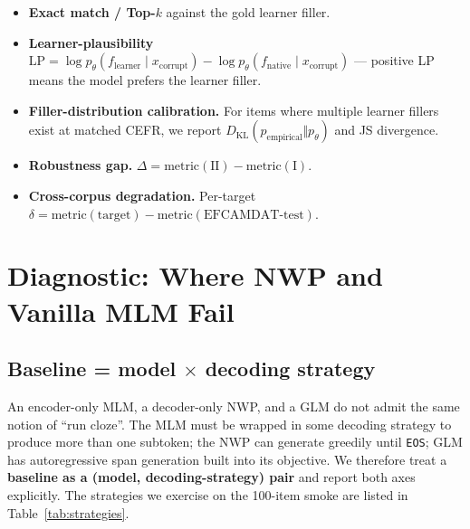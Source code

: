 \documentclass[11pt]{article}
\begin{document}
\begin{itemize}[leftmargin=*,itemsep=0.2em]
    \item \textbf{Exact match / Top-$k$} against the gold learner filler.
    \item \textbf{Learner-plausibility}
    $\mathrm{LP} = \log p_\theta(f_\text{learner}\mid x_\text{corrupt}) - \log p_\theta(f_\text{native}\mid x_\text{corrupt})$
    --- positive LP means the model prefers the learner filler.
    \item \textbf{Filler-distribution calibration.} For items where
    multiple learner fillers exist at matched CEFR, we report
    $D_{\mathrm{KL}}(p_\text{empirical}\Vert p_\theta)$ and JS divergence.
    \item \textbf{Robustness gap.} $\Delta = \text{metric}(\text{II}) - \text{metric}(\text{I})$.
    \item \textbf{Cross-corpus degradation.} Per-target $\delta =
    \text{metric}(\text{target}) - \text{metric}(\text{EFCAMDAT-test})$.
\end{itemize}

\section{Diagnostic: Where NWP and Vanilla MLM Fail}
\label{sec:diagnosis}

\subsection{Baseline = model $\times$ decoding strategy}
\label{sec:decoding-axis}

An encoder-only MLM, a decoder-only NWP, and a GLM do not admit the same
notion of ``run cloze''. The MLM must be wrapped in some decoding strategy
to produce more than one subtoken; the NWP can generate greedily until
\texttt{EOS}; GLM has autoregressive span generation built into its
objective. We therefore treat a \textbf{baseline as a
(model, decoding-strategy) pair} and report both axes explicitly. The
strategies we exercise on the 100-item smoke are listed in
Table~\ref{tab:strategies}.
\end{document}
